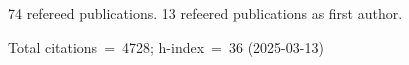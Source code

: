74 refereed publications. 13 refeered publications as first author.

Total citations~=~4728; h-index~=~36 (2025-03-13)